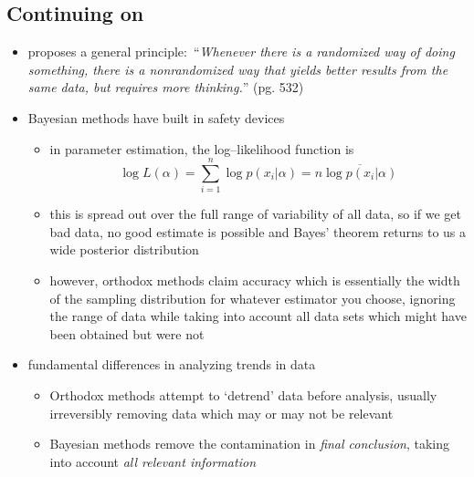 \documentclass[../jaynes_prob_theory_notes.tex]{subfiles}
\begin{document}
        \subsection{Continuing on}
            \begin{itemize} 
                \item proposes a general principle:\ ``\textit{Whenever there is a randomized way of doing something, there is a nonrandomized way that yields better results from the same data, but requires more thinking.}'' (pg. 532)
                \item Bayesian methods have built in safety devices
                    \begin{itemize} 
                        \item in parameter estimation, the log--likelihood function is
                            \begin{equation*} 
                                \log L(\alpha) = \sum\limits^{n}_{i=1} \log p(x_i|\alpha) = n \overline{\log p(x_i|\alpha)}
                            \end{equation*}
                        \item this is spread out over the full range of variability of all data, so if we get bad data, no good estimate is possible and Bayes' theorem returns to us a wide posterior distribution
                        \item however, orthodox methods claim accuracy which is essentially the width of the sampling distribution for whatever estimator you choose, ignoring the range of data while taking into account all data sets which might have been obtained but were not
                    \end{itemize}
                \item fundamental differences in analyzing trends in data
                    \begin{itemize} 
                        \item Orthodox methods attempt to `detrend' data before analysis, usually irreversibly removing data which may or may not be relevant
                        \item Bayesian methods remove the contamination in \textit{final conclusion}, taking into account \textit{all relevant information}
                    \end{itemize}
            \end{itemize}
\end{document}
